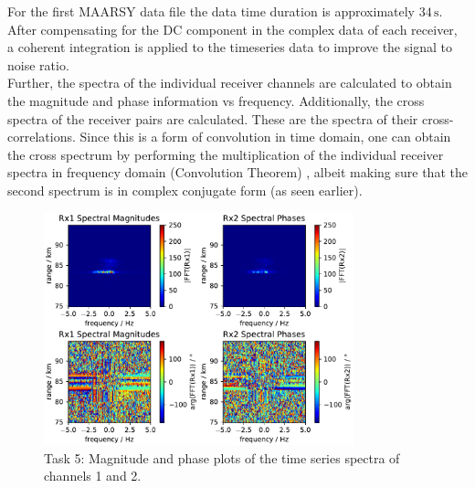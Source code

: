 For the first MAARSY data file the data time duration is approximately $34\,\si{\second}$. After compensating for the DC component in the complex data of each receiver, a coherent integration is applied to the timeseries data to improve the signal to noise ratio.\\

Further, the spectra of the individual receiver channels are calculated to obtain the magnitude and phase information vs frequency. Additionally, the cross spectra of the receiver pairs are calculated. These are the spectra of their cross-correlations. Since this is a form of convolution in time domain, one can obtain the cross spectrum by performing the multiplication of the individual receiver spectra in frequency domain (Convolution Theorem) \cite{conv_theorem}, albeit making sure that the second spectrum is in complex conjugate form (as seen earlier).\\

\begin{figure}
    \begin{center}
        \includegraphics[width=0.8\textwidth]{graphics/t5/t5-reg-mag-phase.pdf}
    \end{center}
    \caption{Task 5: Magnitude and phase plots of the time series spectra of channels 1 and 2.}
    \label{fig:t5-mag-phase}
\end{figure}

